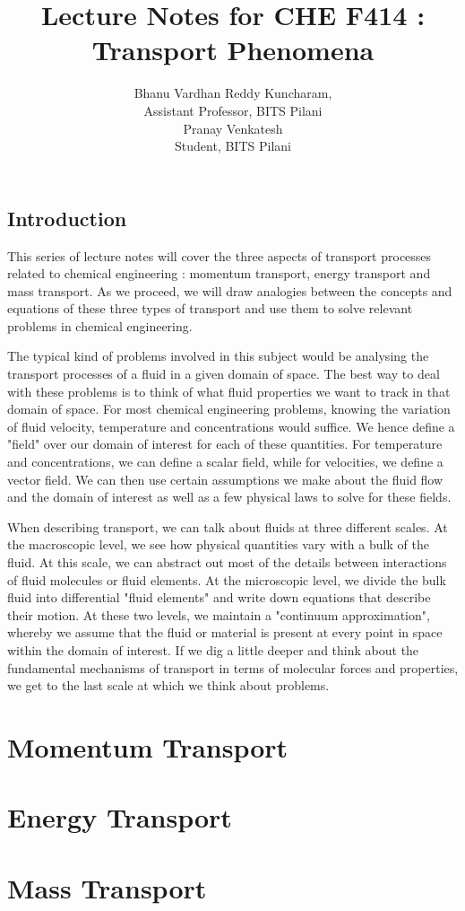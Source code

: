\documentclass{book}
\title{Lecture Notes for CHE F414 : Transport Phenomena}
\author{Bhanu Vardhan Reddy Kuncharam,\\ Assistant Professor, BITS Pilani \\ Pranay Venkatesh \\ Student, BITS Pilani}
\date{}
\begin{document}
\begin{titlepage}
\maketitle
\end{titlepage}


\tableofcontents

\chapter*{Introduction}

This series of lecture notes will cover the three aspects of transport processes related to chemical engineering : momentum transport, energy transport and mass transport. As we proceed, we will draw analogies between the concepts and equations of these three types of transport and use them to solve relevant problems in chemical engineering.

The typical kind of problems involved in this subject would be analysing the transport processes of a fluid in a given domain of space. The best way to deal with these problems is to think of what fluid properties we want to track in that domain of space. For most chemical engineering problems, knowing the variation of fluid velocity, temperature and concentrations would suffice. We hence define a "field" over our domain of interest for each of these quantities. For temperature and concentrations, we can define a scalar field, while for velocities, we define a vector field. We can then use certain assumptions we make about the fluid flow and the domain of interest as well as a few physical laws to solve for these fields.

When describing transport, we can talk about fluids at three different scales. At the macroscopic level, we see how physical quantities vary with a bulk of the fluid. At this scale, we can abstract out most of the details between interactions of fluid molecules or fluid elements. At the microscopic level,  we divide the bulk fluid into differential "fluid elements" and write down equations that describe their motion. At these two levels, we maintain a "continuum approximation", whereby we assume that the fluid or material is present at every point in space within the domain of interest. If we dig a little deeper and think about the fundamental mechanisms of transport in terms of molecular forces and properties, we get to the last scale at which we think about problems. 

\part{Momentum Transport}





\part{Energy Transport}

\part{Mass Transport}
\end{document}
